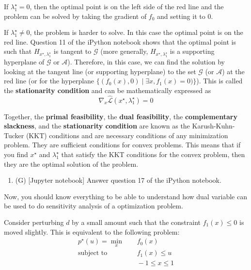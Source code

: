 If $\lambda_1^\star = 0$, then the optimal point is on the left side of the red line and the problem can be solved by taking the gradient of $f_0$ and setting it to $0$.

If $\lambda_1^\star \neq 0$, the problem is harder to solve. In this case the optimal point is on the red line.
Question 11 of the iPython notebook shows that the optimal point is such that $H_{x^\star, \lambda_1^\star}$ is tangent to $\mathcal{G}$ (more generally, $H_{x^\star, \lambda_1^\star}$ is a supporting hyperplane of $\mathcal{G}$ or $\mathcal{A}$).
Therefore, in this case, we can find the solution by looking at the tangent line (or supporting hyperplane) to the set $\mathcal{G}$ (or $\mathcal{A}$) at the red line (or for the hyperplane $\{(f_0(x),0) \mid \exists x, f_1(x)=0)\}$).
This is called the \textbf{stationarity condition} and can be mathematically expressed as
\[\nabla_x \hat{\mathcal{L}}(x^\star, \lambda_1^\star) = 0\]

Together, the \textbf{primal feasibility}, the \textbf{dual feasibility}, the \textbf{complementary slackness}, and the \textbf{stationarity condition} are known as the Karush-Kuhn-Tucker (KKT) conditions and are necessary conditions of any minimization problem. They are sufficient conditions for convex problems.
This means that if you find $x^\star$ and $\lambda_1^\star$ that satisfy the KKT conditions for the convex problem, then they are the optimal solution of the problem.

\begin{enumerate}
    \qitem
    (P) [Algebraic justification] Use the conditions that $\nabla_x \hat{\mathcal{L}}(x^\star, \lambda_1^\star) = 0$ and $c^\top x^\star + d = 0$ to find the optimal value of $x^\star$ and $\lambda_1^\star$ for the problem.
    
    \sol{}
    \item (G) [Jupyter notebook] Answer question 17 of the iPython notebook.
    
    \sol{}
\end{enumerate}

Now, you should know everything to be able to understand how dual variable can be used to do sensitivity analysis of a optimization problem.


Consider perturbing $d$ by a small amount such that the constraint $f_1(x)\leq 0$ is moved slightly. This is equivalent to the following problem:
\begin{align*}
    p^\star(u) = \min_x &\;\;\;\;f_0(x) \\
    \text{subject to} & \;\;\;\; f_1(x) \leq u \\
    & \;\;\;\; -1 \leq x \leq 1
\end{align*}

